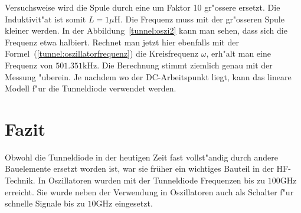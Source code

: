 \begin{refsection}
Versuchsweise wird die Spule durch eine um Faktor 10 gr"ossere ersetzt. 
Die Induktivit"at ist somit $L=1\mu\text{H}$. 
Die Frequenz muss mit der gr"osseren Spule kleiner werden. 
In der Abbildung~\ref{tunnel:oszi2} kann man sehen, dass sich die Frequenz etwa halbiert.
Rechnet man jetzt hier ebenfalls mit der Formel~(\ref{tunnel:oszillatorfrequenz}) die Kreisfrequenz $\omega$, erh"alt man eine Frequenz von $501.351\text{kHz}$.
Die Berechnung stimmt ziemlich genau mit der Messung "uberein.
Je nachdem wo der DC-Arbeitspunkt liegt, kann das lineare Modell f"ur die Tunneldiode verwendet werden.


\section{Fazit}
Obwohl die Tunneldiode in der heutigen Zeit fast vollst"andig durch andere Bauelemente ersetzt worden ist, war sie früher ein wichtiges Bauteil in der HF-Technik.
In Oszillatoren wurden mit der Tunneldiode Frequenzen bis zu $100\text{GHz}$ erreicht.
Sie wurde neben der Verwendung in Oszillatoren auch als Schalter f"ur schnelle Signale bis zu $10\text{GHz}$ eingesetzt.

\printbibliography[heading=subbibliography]
\end{refsection}

